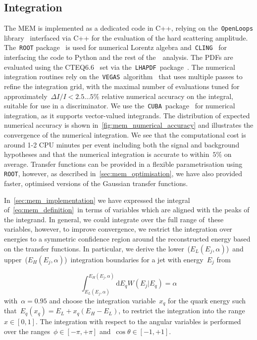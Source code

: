 \subsection{Integration}
\label{sec:mem_integration}

The MEM is implemented as a dedicated code in C++, relying on the~\texttt{OpenLoops} library~\cite{Cascioli:2011va} interfaced via C++ for the evaluation of the hard scattering amplitude. The~\texttt{ROOT} package~\cite{Brun:1997pa} is used for numerical Lorentz algebra and~\texttt{CLING}~\cite{Vasilev:2012ev} for interfacing the code to Python and the rest of the~\ttHbb~analysis. The PDFs are evaluated using the CTEQ6.6~\cite{Nadolsky:2008zw} set via the~\texttt{LHAPDF}~package~\cite{Buckley:2014ana}. The numerical integration routines rely on the~\texttt{VEGAS}~algorithm~\cite{Lepage:1977sw} that uses multiple passes to refine the integration grid, with the maximal number of evaluations tuned for approximately~$\Delta I / I < 2.5 \dots 5\%$ relative numerical accuracy on the integral, suitable for use in a discriminator. We use the~\texttt{CUBA}~package~\cite{Hahn:2004fe} for numerical integration, as it supports vector-valued integrands. The distribution of expected numerical accuracy is shown in~\cref{fig:mem_numerical_accuracy} and illustrates the convergence of the numerical integration. We see that the computational cost is around 1-2 CPU minutes per event including both the signal and background hypotheses and that the numerical integration is accurate to within~$5\%$ on average. Transfer functions can be provided in a flexible parametrisation using \texttt{ROOT}, however, as described in~\cref{sec:mem_optimisation}, we have also provided faster, optimised versions of the Gaussian transfer functions.

In~\cref{sec:mem_implementation} we have expressed the integral of~\cref{eq:mem_definition}~in terms of variables which are aligned with the peaks of the integrand. In general, we could integrate over the full range of these variables, however, to improve convergence, we restrict the integration over energies to a symmetric confidence region around the reconstructed energy based on the transfer functions. In particular, we derive the lower~($E_L(E_j,\alpha)$)~and upper~($E_H(E_j,\alpha)$)~integration boundaries for a jet with energy~$E_j$ from

\begin{equation}
\int_{E_L(E_j,\alpha)}^{E_H(E_j,\alpha)} \mathrm{d}E_q W(E_j | E_q) = \alpha
\end{equation}
with~$\alpha = 0.95$ and choose the integration variable~$x_q$ for the quark energy such that~$E_q(x_q) = E_L + x_q (E_H - E_L)$, to restrict the integration into the range~$x\in[0,1]$. The integration with respect to the angular variables is performed over the ranges~$\phi \in [-\pi, +\pi]$ and~$\cos{\theta} \in [-1, +1]$.


